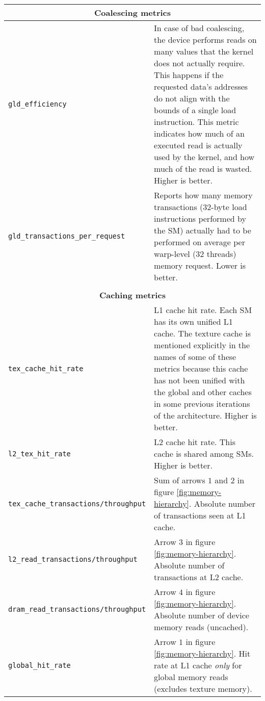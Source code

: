 \begin{center}
\begin{longtable}{p{} p{}}
    \\
    \multicolumn{2}{c}{\textbf{Coalescing metrics}} \\
    \hline
    \hline
    \raggedright \texttt{gld\_\allowbreak efficiency} & In case of bad coalescing, the device performs reads on many values that the kernel does not actually require. This happens if the requested data's addresses do not align with the bounds of a single load instruction. This metric indicates how much of an executed read is actually used by the kernel, and how much of the read is wasted. Higher is better. \\
    \hline
    \raggedright \texttt{gld\_\allowbreak transactions\_\allowbreak per\_\allowbreak request} & Reports how many memory transactions (32-byte load instructions performed by the SM) actually had to be performed on average per warp-level (32 threads) memory request. Lower is better. \\
    
    \\
    \multicolumn{2}{c}{\textbf{Caching metrics}} \\
    \hline
    \hline
    
    \raggedright \texttt{tex\_\allowbreak cache\_\allowbreak hit\_\allowbreak rate} & L1 cache hit rate. Each SM has its own unified L1 cache. The texture cache is mentioned explicitly in the names of some of these metrics because this cache has not been unified with the global and other caches in some previous iterations of the architecture. Higher is better. \\
    \hline
    \raggedright \texttt{l2\_\allowbreak tex\_\allowbreak hit\_\allowbreak rate} & L2 cache hit rate. This cache is shared among SMs. Higher is better. \\
    \hline
    \raggedright \texttt{tex\_\allowbreak cache\_\allowbreak transactions/throughput} & Sum of arrows $1$ and $2$ in figure \ref{fig:memory-hierarchy}. Absolute number of transactions seen at L1 cache. \\
    \hline
    \raggedright \texttt{l2\_\allowbreak read\_\allowbreak transactions/throughput} & Arrow $3$ in figure \ref{fig:memory-hierarchy}. Absolute number of transactions at L2 cache. \\
    \hline
    \raggedright \texttt{dram\_\allowbreak read\_\allowbreak transactions/throughput} & Arrow $4$ in figure \ref{fig:memory-hierarchy}. Absolute number of device memory reads (uncached). \\
    \hline
    \raggedright \texttt{global\_\allowbreak hit\_\allowbreak rate} & Arrow $1$ in figure \ref{fig:memory-hierarchy}. Hit rate at L1 cache \emph{only} for global memory reads (excludes texture memory). \\
    

\end{longtable}
\end{center}
